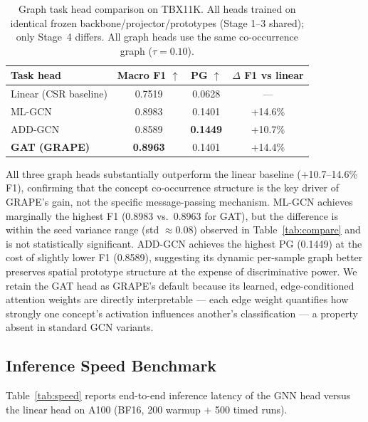 \documentclass{article}
\begin{document}
\begin{table}[t]
  \caption{Graph task head comparison on TBX11K. All heads trained on identical frozen backbone/projector/prototypes (Stage 1--3 shared); only Stage~4 differs. All graph heads use the same co-occurrence graph ($\tau=0.10$).}
  \label{tab:graph_heads}
  \centering
  \begin{tabular}{lccc}
    \toprule
    Task head & Macro F1 $\uparrow$ & PG $\uparrow$ & $\Delta$ F1 vs linear \\
    \midrule
    Linear (CSR baseline)              & 0.7519           & 0.0628           & — \\
    ML-GCN~\cite{chen2019multilabel}   & 0.8983           & 0.1401           & +14.6\% \\
    ADD-GCN~\cite{ye2020attention}     & 0.8589           & \textbf{0.1449}  & +10.7\% \\
    \textbf{GAT (GRAPE)}               & \textbf{0.8963}  & 0.1401           & +14.4\% \\
    \bottomrule
  \end{tabular}
\end{table}

All three graph heads substantially outperform the linear baseline (+10.7--14.6\% F1), confirming that the concept co-occurrence structure is the key driver of GRAPE's gain, not the specific message-passing mechanism.
ML-GCN achieves marginally the highest F1 (0.8983 vs.\ 0.8963 for GAT), but the difference is within the seed variance range (std $\approx 0.08$) observed in Table~\ref{tab:compare} and is not statistically significant.
ADD-GCN achieves the highest PG (0.1449) at the cost of slightly lower F1 (0.8589), suggesting its dynamic per-sample graph better preserves spatial prototype structure at the expense of discriminative power.
We retain the GAT head as GRAPE's default because its learned, edge-conditioned attention weights are directly interpretable — each edge weight quantifies how strongly one concept's activation influences another's classification — a property absent in standard GCN variants.

\subsection{Inference Speed Benchmark}
\label{sec:speed}

Table~\ref{tab:speed} reports end-to-end inference latency of the GNN head versus the linear head on A100 (BF16, 200 warmup + 500 timed runs).
\end{document}

